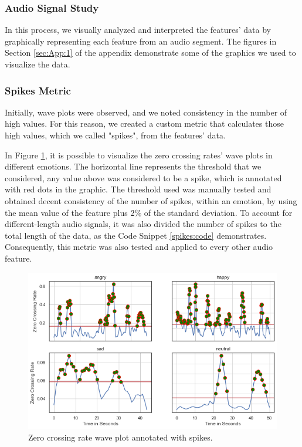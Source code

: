 \subsubsection{Audio Signal Study}

In this process, we visually analyzed and interpreted the features' data by graphically representing each feature from an audio segment. The figures in Section \ref{sec:App:1} of the appendix demonstrate some of the graphics we used to visualize the data.

\subsubsection{Spikes Metric}
\label{spikes:metric}

Initially, wave plots were observed, and we noted consistency in the number of high values. For this reason, we created a custom metric that calculates those high values, which we called "spikes", from the features' data.

In Figure \ref{fig:zcrSpikes}, it is possible to visualize the zero crossing rates' wave plots in different emotions. The horizontal line represents the threshold that we considered, any value above was considered to be a spike, which is annotated with red dots in the graphic. The threshold used was manually tested and obtained decent consistency of the number of spikes, within an emotion, by using the mean value of the feature plus 2\% of the standard deviation. To account for different-length audio signals, it was also divided the number of spikes to the total length of the data, as the Code Snippet \ref{spikes:code} demonstrates. Consequently, this metric was also tested and applied to every other audio feature.

\begin{figure}[H]
	\centering
	\includegraphics[width=.7\textwidth]{figs/4_1_traditional/zcr_waveplot_spikes.png}
	\caption{Zero crossing rate wave plot annotated with spikes.}
	\label{fig:zcrSpikes}
\end{figure}

